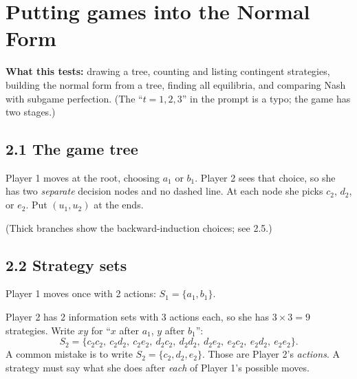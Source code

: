 \documentclass[11pt]{article}
\begin{document}
\section{Putting games into the Normal Form}

\textbf{What this tests:} drawing a tree, counting and listing contingent strategies, building the normal form from a tree, finding all equilibria, and comparing Nash with subgame perfection. (The ``$t=1,2,3$'' in the prompt is a typo; the game has two stages.)

\subsection*{2.1 The game tree}
Player 1 moves at the root, choosing $a_1$ or $b_1$. Player 2 sees that choice, so she has two \emph{separate} decision nodes and no dashed line. At each node she picks $c_2$, $d_2$, or $e_2$. Put $(u_1,u_2)$ at the ends.
\begin{center}
\end{center}
(Thick branches show the backward-induction choices; see 2.5.)

\subsection*{2.2 Strategy sets}
Player 1 moves once with 2 actions: $S_1=\{a_1,b_1\}$.

Player 2 has 2 information sets with 3 actions each, so she has $3\times3=9$ strategies. Write $xy$ for ``$x$ after $a_1$, $y$ after $b_1$'':
\[
S_2=\{c_2c_2,\ c_2d_2,\ c_2e_2,\ d_2c_2,\ d_2d_2,\ d_2e_2,\ e_2c_2,\ e_2d_2,\ e_2e_2\}.
\]
A common mistake is to write $S_2=\{c_2,d_2,e_2\}$. Those are Player 2's \emph{actions}. A strategy must say what she does after \emph{each} of Player 1's possible moves.
\end{document}
